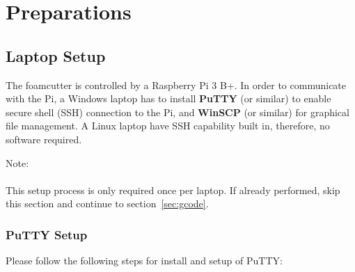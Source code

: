 \documentclass[titlepage,12pt,letter]{report}
\numberwithin{equation}{chapter}
\begin{document}
\newpage
\tableofcontents
\newpage

\chapter{Preparations}
\section{Laptop Setup} 
\label{sec:laptop}

The foamcutter is controlled by a Raspberry Pi 3 B+. In order to communicate with the Pi, a Windows laptop has to install \textbf{PuTTY} (or similar) to enable secure shell (SSH) connection to the Pi, and \textbf{WinSCP} (or similar) for graphical file management. A Linux laptop have SSH capability built in, therefore, no software required.

\begin{tcolorbox}
	{\large
		Note:\\ \\
		 This setup process is only required once per laptop. If already performed, skip this section and continue to section~\ref{sec:gcode}.
	}
\end{tcolorbox}

\subsection{PuTTY Setup}

\noindent Please follow the following steps for install and setup of PuTTY:
\end{document}
